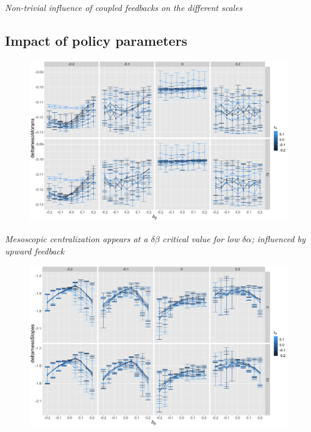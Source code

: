 \documentclass[11pt]{article}
\begin{document}
\textit{Non-trivial influence of coupled feedbacks on the different scales}



\subsection{Impact of policy parameters}


\begin{figure}
\includegraphics[height=0.7\textheight]{figures/deltamesoMorans-macroMesoAlphaUpdateMax_colormacroMesoBetaUpdateMax_facetmesoMacroCongestionCost-mesoMacroDecayUpdateMax_mesoBeta0_11.png}
\end{figure}

\textit{Mesoscopic centralization appears at a $\delta \beta$ critical value for low $\delta \alpha$; influenced by upward feedback}


\begin{figure}
\includegraphics[height=0.7\textheight]{figures/deltamesoSlopes-macroMesoAlphaUpdateMax_colormacroMesoBetaUpdateMax_facetmesoMacroCongestionCost-mesoMacroDecayUpdateMax_mesoBeta0_11.png}
\end{figure}
\end{document}
